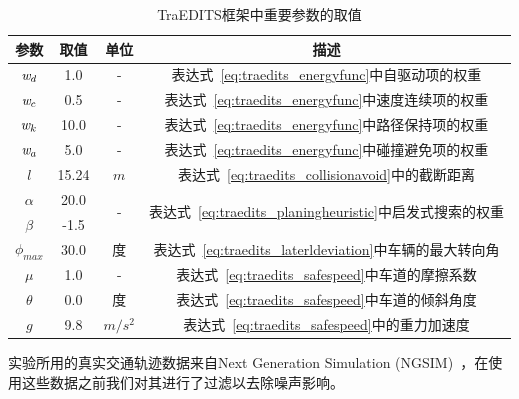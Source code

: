 \begin{table}[!tbh]
\setlength{\belowcaptionskip}{.4cm}
\centering
\renewcommand\arraystretch{1.8}
\caption[TraEDITS框架中重要参数的取值]{TraEDITS框架中重要参数的取值}
\begin{tabular}{|c|c|c|c|}
\hline
\textbf{参数} & \textbf{取值} & \textbf{单位} & \textbf{描述}                                                         \\ \hline
$\emph{w}_d$    & 1.0 & -         & 表达式~\ref{eq:traedits_energyfunc}中自驱动项的权重      \\ \hline
$\emph{w}_c$    & 0.5 & -         & 表达式~\ref{eq:traedits_energyfunc}中速度连续项的权重 \\ \hline
$\emph{w}_k$    & 10.0 & -         & 表达式~\ref{eq:traedits_energyfunc}中路径保持项的权重        \\ \hline
$\emph{w}_a$    & 5.0 & -         & 表达式~\ref{eq:traedits_energyfunc}中碰撞避免项的权重 \\ \hline
$l$                &        15.24        & $m$        & 表达式~\ref{eq:traedits_collisionavoid}中的截断距离 \\ \hline
$\alpha$           &        20.0        & \multirow{2}{*}{-}             & \multirow{2}{*}{表达式~\ref{eq:traedits_planingheuristic}中启发式搜索的权重}  \\ 
$\beta$  & -1.5 &          &                                                        \\ \hline
$\phi_{max}$       &        30.0        & 度      &  表达式~\ref{eq:traedits_laterldeviation}中车辆的最大转向角                   \\ \hline
$\mu$    & 1.0 & -         & 表达式~\ref{eq:traedits_safespeed}中车道的摩擦系数                \\ \hline
$\theta$ & 0.0 & 度  & 表达式~\ref{eq:traedits_safespeed}中车道的倾斜角度              \\ \hline
$g$      & 9.8 & $m/s^{2}$ & 表达式~\ref{eq:traedits_safespeed}中的重力加速度 \\ \hline         
\end{tabular}
\label{tab:traedits_parameters}
\end{table}



实验所用的真实交通轨迹数据来自Next Generation Simulation (NGSIM)~\cite{alexiadis2004next}，在使用这些数据之前我们对其进行了过滤以去除噪声影响。

